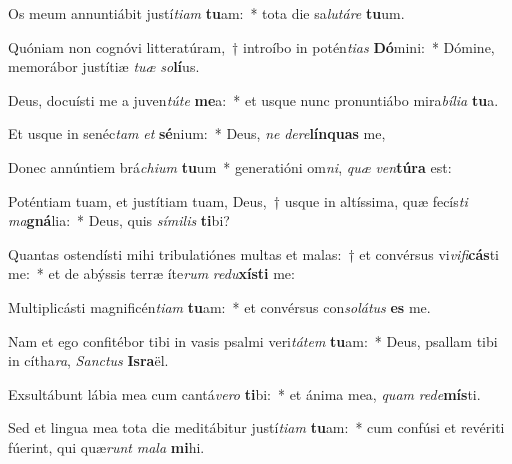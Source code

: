 \item Os meum annuntiábit justí\textit{ti}\textit{am} \textbf{tu}am:~* tota die sa\textit{lu}\textit{tá}\textit{re} \textbf{tu}um.
\item Quóniam non cognóvi litteratúram,~† introíbo in potén\textit{ti}\textit{as} \textbf{Dó}mini:~* Dómine, memorábor justítiæ \textit{tu}\textit{æ} \textit{so}\textbf{lí}us.
\item Deus, docuísti me a juven\textit{tú}\textit{te} \textbf{me}a:~* et usque nunc pronuntiábo mira\textit{bí}\textit{li}\textit{a} \textbf{tu}a.
\item Et usque in senéc\textit{tam} \textit{et} \textbf{sé}nium:~* Deus, \textit{ne} \textit{de}\textit{re}\textbf{lín}\textbf{quas} me,
\item Donec annúntiem brá\textit{chi}\textit{um} \textbf{tu}um~* generatióni om\textit{ni}, \textit{quæ} \textit{ven}\textbf{tú}\textbf{ra} est:
\item Poténtiam tuam, et justítiam tuam, Deus,~† usque in altíssima, quæ fecís\textit{ti} \textit{ma}\textbf{gná}lia:~* Deus, quis \textit{sí}\textit{mi}\textit{lis} \textbf{ti}bi?
\item Quantas ostendísti mihi tribulatiónes multas et malas:~† et convérsus vi\textit{vi}\textit{fi}\textbf{cás}ti me:~* et de abýssis terræ íte\textit{rum} \textit{re}\textit{du}\textbf{xís}\textbf{ti} me:
\item Multiplicásti magnificén\textit{ti}\textit{am} \textbf{tu}am:~* et convérsus con\textit{so}\textit{lá}\textit{tus} \textbf{es} me.
\item Nam et ego confitébor tibi in vasis psalmi veri\textit{tá}\textit{tem} \textbf{tu}am:~* Deus, psallam tibi in cítha\textit{ra}, \textit{Sanc}\textit{tus} \textbf{Is}\textbf{ra}ël.
\item Exsultábunt lábia mea cum cantá\textit{ve}\textit{ro} \textbf{ti}bi:~* et ánima mea, \textit{quam} \textit{red}\textit{e}\textbf{mís}ti.
\item Sed et lingua mea tota die meditábitur justí\textit{ti}\textit{am} \textbf{tu}am:~* cum confúsi et revériti fúerint, qui quæ\textit{runt} \textit{ma}\textit{la} \textbf{mi}hi.
